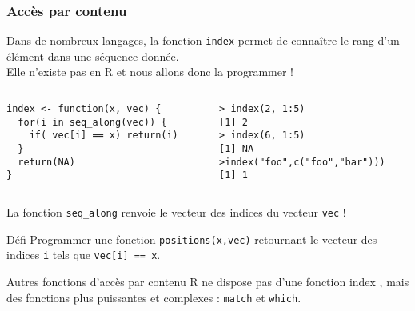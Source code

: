 \documentclass[10pt]{beamer}
\begin{document}
\begin{frame}[fragile]
  \frametitle{Accès par contenu}
  Dans de nombreux langages, la fonction \alert{\texttt{index}} permet de connaître le rang d'un élément dans une séquence donnée. \\
  Elle n'existe pas en R et nous allons donc la programmer !
  
\begin{columns}[t]
\begin{column}{0.50\textwidth}
\begin{lstlisting}[style=editor]
index <- function(x, vec) {
  for(i in seq_along(vec)) {
    if( vec[i] == x) return(i)
  }
  return(NA)
}
\end{lstlisting}
\end{column}
\begin{column}{0.5\textwidth}
\begin{lstlisting}
> index(2, 1:5)
[1] 2
> index(6, 1:5)
[1] NA
>index("foo",c("foo","bar")))
[1] 1
\end{lstlisting}
\end{column}
\end{columns}

La fonction \texttt{seq\_along} renvoie le vecteur des indices du vecteur \texttt{vec} !

\begin{block}{Défi}
  Programmer une fonction \texttt{positions(x,vec)} retournant le vecteur des indices \texttt{i} tels que \texttt{vec[i] == x}.
\end{block}

\begin{alertblock}{Autres fonctions d'accès par contenu}
  R ne dispose pas d’une fonction index , mais des fonctions plus puissantes et complexes : \alert{\texttt{match}} et \alert{\texttt{which}}.
\end{alertblock}
\end{frame}
\end{document}
